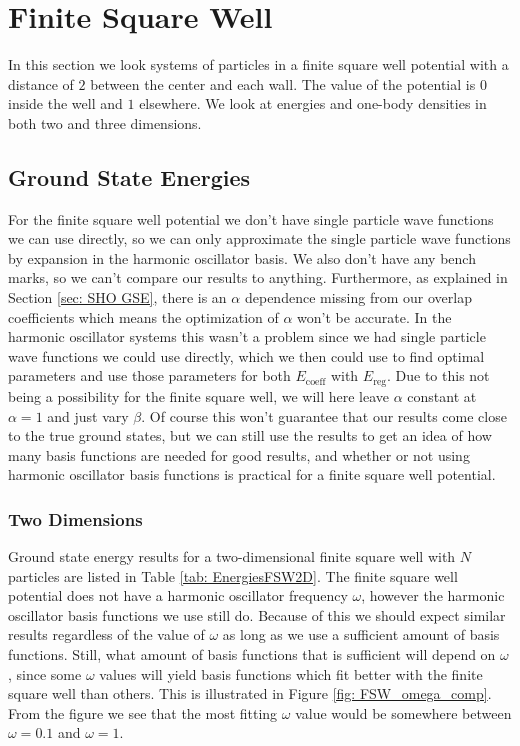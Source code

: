 \documentclass[../main.tex]{subfiles}
\begin{document}
\section{Finite Square Well}

In this section we look systems of particles in a finite square well potential with a distance of $2$ between the center and each wall. The value of the potential is $0$ inside the well and $1$ elsewhere. We look at energies and one-body densities in both two and three dimensions.

\subsection{Ground State Energies}

For the finite square well potential we don't have single particle wave functions we can use directly, so we can only approximate the single particle wave functions by expansion in the harmonic oscillator basis. We also don't have any bench marks, so we can't compare our results to anything. Furthermore, as explained in Section \ref{sec: SHO GSE}, there is an $\alpha$ dependence missing from our overlap coefficients which means the optimization of $\alpha$ won't be accurate. In the harmonic oscillator systems this wasn't a problem since we had single particle wave functions we could use directly, which we then could use to find optimal parameters and use those parameters for both $E_\textrm{coeff}$ with $E_\textrm{reg}$. Due to this not being a possibility for the finite square well, we will here leave $\alpha$ constant at $\alpha = 1$ and just vary $\beta$. Of course this won't guarantee that our results come close to the true ground states, but we can still use the results to get an idea of how many basis functions are needed for good results, and whether or not using harmonic oscillator basis functions is practical for a finite square well potential.

\subsubsection{Two Dimensions}

Ground state energy results for a two-dimensional finite square well with $N$ particles are listed in Table \ref{tab: EnergiesFSW2D}. The finite square well potential does not have a harmonic oscillator frequency $\omega$, however the harmonic oscillator basis functions we use still do. Because of this we should expect similar results regardless of the value of $\omega$ as long as we use a sufficient amount of basis functions. Still, what amount of basis functions that is sufficient will depend on $\omega$, since some $\omega$ values will yield basis functions which fit better with the finite square well than others. This is illustrated in Figure \ref{fig: FSW_omega_comp}. From the figure we see that the most fitting $\omega$ value would be somewhere between $\omega = 0.1$ and $\omega = 1$.
\end{document}
